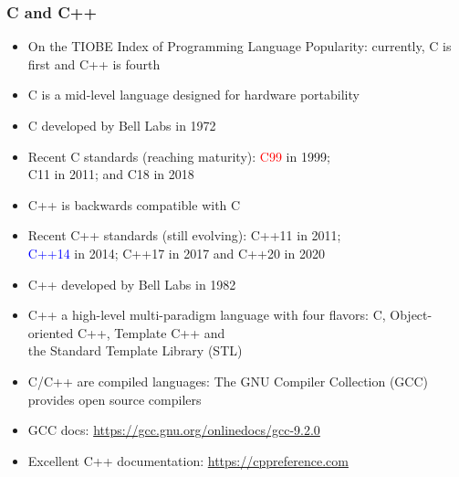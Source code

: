 \documentclass[11pt,pdftex,dvipsnames,usenames,helvetica]{beamer}
\begin{document}
\begin{frame}[fragile]
\frametitle{C and C++}

\begin{itemize}
\item On the TIOBE Index of Programming Language Popularity:
currently, C is first and C++ is fourth
\item C is a mid-level language designed for hardware portability
\item C developed by Bell Labs in 1972 %
\item Recent C standards (reaching maturity): \textcolor{red}{C99} in 1999;\\ 
C11 in 2011; and C18 in 2018
\item C++ is backwards compatible with C
\item Recent C++ standards (still evolving): C++11 in 2011;\\
 \textcolor{blue}{C++14} in 2014; C++17 in 2017 and C++20 in 2020
\item C++ developed by Bell Labs in 1982 %
\item C++ a high-level multi-paradigm language with four flavors:
C, Object-oriented C++, Template C++ and\\ 
the Standard Template Library (STL)
\item C/C++ are compiled languages: The GNU Compiler Collection (GCC)
provides open source compilers 
\item GCC docs: \url{https://gcc.gnu.org/onlinedocs/gcc-9.2.0}
\item Excellent C++ documentation: \url{https://cppreference.com}
\end{itemize}

\end{frame}
\end{document}
